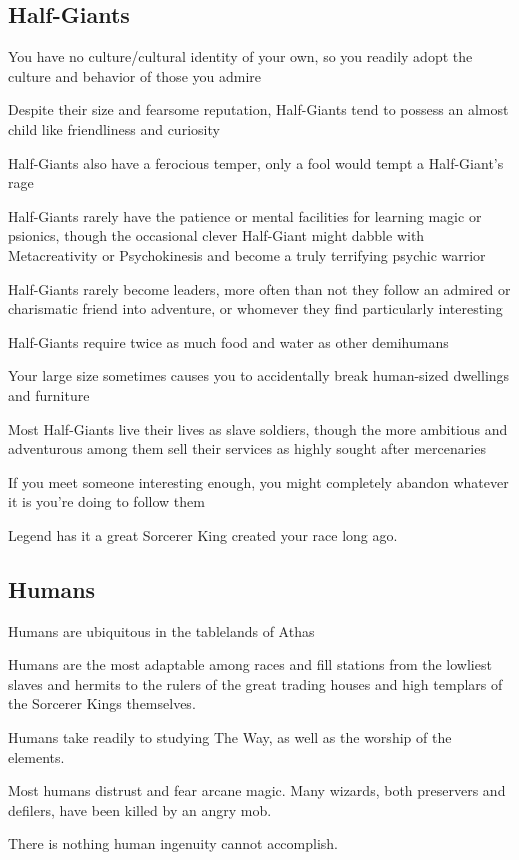 \begin{multicols}{2}
\subsection{Half-Giants}

\begin{description}
    \item You have no culture/cultural identity of your own, so you readily adopt the culture and behavior of those you admire
    \item Despite their size and fearsome reputation, Half-Giants tend to possess an almost child like friendliness and curiosity
    \item Half-Giants also have a ferocious temper, only a fool would tempt a Half-Giant’s rage
    \item Half-Giants rarely have the patience or mental facilities for learning magic or psionics, though the occasional clever Half-Giant might dabble with Metacreativity or Psychokinesis and become a truly terrifying psychic warrior
    \item Half-Giants rarely become leaders, more often than not they follow an admired or charismatic friend into adventure, or whomever they find particularly interesting
    \item Half-Giants require twice as much food and water as other demihumans
    \item Your large size sometimes causes you to accidentally break human-sized dwellings and furniture
    \item Most Half-Giants live their lives as slave soldiers, though the more ambitious and adventurous among them sell their services as highly sought after mercenaries
    \item If you meet someone interesting enough, you might completely abandon whatever it is you’re doing to follow them
    \item Legend has it a great Sorcerer King created your race long ago.
\end{description}

\subsection{Humans}

\begin{description}
    \item Humans are ubiquitous in the tablelands of Athas
    \item Humans are the most adaptable among races and fill stations from the lowliest slaves and hermits to the rulers of the great trading houses and high templars of the Sorcerer Kings themselves.
    \item Humans take readily to studying The Way, as well as the worship of the elements.
    \item Most humans distrust and fear arcane magic. Many wizards, both preservers and defilers, have been killed by an angry mob.
    \item There is nothing human ingenuity cannot accomplish.
\end{description}


\end{multicols}
